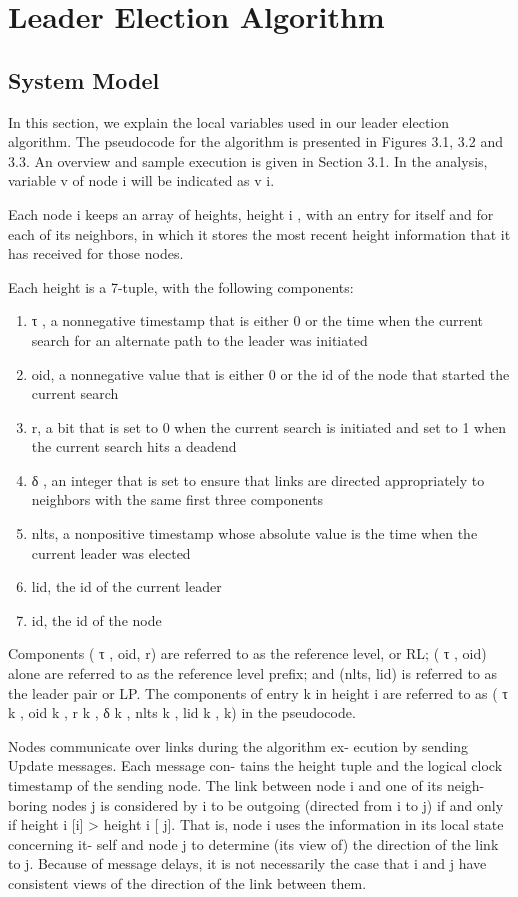 \chapter{Leader Election Algorithm}

\section{System Model}
In this section, we explain the local variables used in our leader election algorithm. The pseudocode for the algorithm is presented in Figures 3.1, 3.2 and 3.3. An overview and sample execution is given in Section 3.1. In the analysis, variable v of node i will be indicated as v i.

Each node i keeps an array of heights, height i , with an entry for itself and for each of its neighbors, in which it stores the most recent height information that it has received for those nodes.

Each height is a 7-tuple, with the following components:
\begin{enumerate}
\item τ , a nonnegative timestamp that is either 0 or the time when the current search for an alternate path to the leader was initiated
\item oid, a nonnegative value that is either 0 or the id of the node that started the current search
\item r, a bit that is set to 0 when the current search is initiated and set to 1 when the current search hits a deadend
\item δ , an integer that is set to ensure that links are directed appropriately to neighbors with the same first three components
\item nlts, a nonpositive timestamp whose absolute value is the time when the current leader was elected
\item lid, the id of the current leader
\item id, the id of the node
\end{enumerate}
Components ( τ , oid, r) are referred to as the reference
level, or RL; ( τ , oid) alone are referred to as the reference
level prefix; and (nlts, lid) is referred to as the leader pair
or LP. The components of entry k in height i are referred to
as ( τ k , oid k , r k , δ k , nlts k , lid k , k) in the pseudocode.

Nodes communicate over links during the algorithm ex-
ecution by sending Update messages. Each message con-
tains the height tuple and the logical clock timestamp of the
sending node. The link between node i and one of its neigh-
boring nodes j is considered by i to be outgoing (directed
from i to j) if and only if height i [i] > height i [ j]. That is,
node i uses the information in its local state concerning it-
self and node j to determine (its view of) the direction of the
link to j. Because of message delays, it is not necessarily
the case that i and j have consistent views of the direction
of the link between them.

